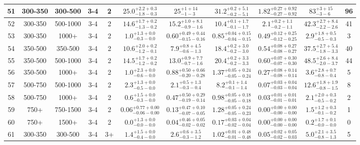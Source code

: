 \documentclass[11pt, oneside]{article}
\begin{document}
\begin{table}
{\begin{tabular}{ |c|c|c|c|c||c|c|c|c||c|c| }
51 & 300-350 & 300-500 & 3-4 & 2 & $25.0^{+2.2+0.3}_{-1.8-0.3}$ & $25^{+ 1+14}_{- 1- 3}$ & $31.2^{+0.2+5.1}_{-0.2-5.1}$ & $1.82^{+0.27+0.92}_{-0.27-0.92}$ & $83^{+ 3+15}_{- 3- 6}$ & 96 \\ \hline
52 & 300-350 & 500-1000 & 3-4 & 2 & $14.6^{+1.7+0.2}_{-1.3-0.2}$ & $15.2^{+1.0+8.1}_{-0.9-1.6}$ & $10.4^{+0.1+1.7}_{-0.1-1.7}$ & $2.1^{+0.2+1.1}_{-0.2-1.1}$ & $42.3^{+2.7+8.4}_{-2.2-2.6}$ & 41 \\ \hline
53 & 300-350 & 1000+ & 3-4 & 2 & $1.0^{+1.3+0.0}_{-0.3-0.0}$ & $0.60^{+0.49+0.44}_{-0.15-0.16}$ & $0.85^{+0.04+0.15}_{-0.04-0.15}$ & $0.49^{+0.12+0.25}_{-0.12-0.25}$ & $2.9^{+1.8+0.5}_{-0.5-0.3}$ & 3 \\ \hline
54 & 350-500 & 350-500 & 3-4 & 2 & $10.6^{+2.0+0.2}_{-1.2-0.1}$ & $7.9^{+0.8+4.5}_{-0.6-1.3}$ & $18.4^{+0.2+3.0}_{-0.2-3.0}$ & $0.54^{+0.08+0.27}_{-0.08-0.27}$ & $37.5^{+2.7+5.4}_{-1.8-3.3}$ & 40 \\ \hline
55 & 350-500 & 500-1000 & 3-4 & 2 & $14.5^{+1.7+0.2}_{-1.2-0.2}$ & $13.0^{+0.9+7.7}_{-0.7-1.6}$ & $20.4^{+0.2+3.3}_{-0.2-3.3}$ & $0.60^{+0.07+0.30}_{-0.07-0.30}$ & $48.5^{+2.6+8.4}_{-2.0-3.7}$ & 44 \\ \hline
56 & 350-500 & 1000+ & 3-4 & 2 & $1.0^{+2.3+0.0}_{-0.6-0.0}$ & $0.88^{+0.50+0.66}_{-0.20-0.28}$ & $1.37^{+0.05+0.24}_{-0.05-0.24}$ & $0.27^{+0.08+0.14}_{-0.08-0.14}$ & $3.6^{+2.8+0.7}_{-0.8-0.4}$ & 5 \\ \hline
57 & 500-750 & 500-1000 & 3-4 & 2 & $2.3^{+1.3+0.0}_{-0.5-0.0}$ & $2.1^{+0.5+1.3}_{-0.3-0.4}$ & $8.2^{+0.1+1.4}_{-0.1-1.4}$ & $0.07^{+0.03+0.04}_{-0.03-0.04}$ & $12.6^{+1.8+1.9}_{-0.8-1.5}$ & 8 \\ \hline
58 & 500-750 & 1000+ & 3-4 & 2 & $0.6^{+1.5+0.0}_{-0.3-0.0}$ & $0.47^{+0.50+0.29}_{-0.19-0.14}$ & $0.98^{+0.05+0.18}_{-0.05-0.18}$ & $0.03^{+0.01+0.01}_{-0.01-0.01}$ & $2.1^{+2.0+0.3}_{-0.5-0.2}$ & 2 \\ \hline
59 & 750+ & 750-1500 & 3-4 & 2 & $0.06^{+0.77+0.00}_{-0.06-0.00}$ & $0.13^{+0.47+0.10}_{-0.07-0.05}$ & $1.28^{+0.05+0.24}_{-0.05-0.23}$ & $0.00^{+0.00+0.00}_{-0.00-0.00}$ & $1.5^{+1.2+0.3}_{-0.1-0.2}$ & 1 \\ \hline
60 & 750+ & 1500+ & 3-4 & 2 & $0.0^{+1.3+0.0}_{-0.0-0.0}$ & $0.04^{+0.46+0.05}_{-0.02-0.02}$ & $0.17^{+0.03+0.04}_{-0.02-0.04}$ & $0.00^{+0.00+0.00}_{-0.00-0.00}$ & $0.2^{+1.7+0.1}_{-0.0-0.0}$ & 0 \\ \hline
61 & 300-350 & 300-500 & 3-4 & 3+ & $1.4^{+1.5+0.0}_{-0.4-0.0}$ & $2.6^{+0.6+3.5}_{-0.3-1.2}$ & $1.02^{+0.01+0.48}_{-0.01-0.48}$ & $0.05^{+0.02+0.05}_{-0.02-0.03}$ & $5.0^{+2.1+3.5}_{-0.8-1.3}$ & 5 \\ \hline

\end{tabular}}
\end{table}
\end{document}

